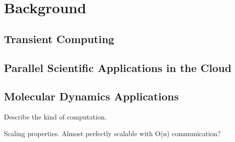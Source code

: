 
\section{Background}

\subsection{Transient Computing}

\subsection{Parallel Scientific Applications in the Cloud}

\subsection{Molecular Dynamics Applications}
Describe the kind of computation.

Scaling properties. Almost perfectly scalable with O(n) communication? 





